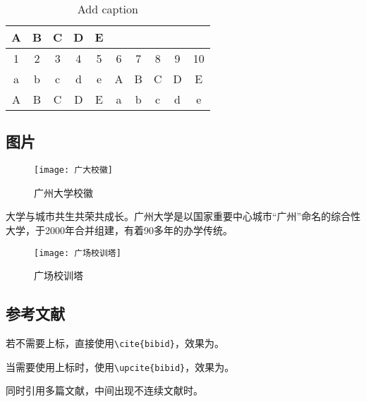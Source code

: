 \begin{table}[!htbp]
	\centering
	\caption{Add caption}	\label{tab:2}%
	\begin{tabular}{cccccccccc}
		\toprule
		A           & B           & C           & D           & E \\
		\midrule
		1           & 2           & 3           & 4           & 5  & 6           & 7           & 8           & 9           & 10\\
		a           & b           & c           & d           & e &A           & B           & C           & D           & E\\
		A           & B           & C           & D           & E &a           & b           & c           & d           & e \\
		\bottomrule
	\end{tabular}
\end{table}


\subsection{图片}

\begin{figure}[!htb]
	\centering
	\texttt{[image: 广大校徽]}
	\caption{广州大学校徽}
	\label{fig:01}
\end{figure}

大学与城市共生共荣共成长。广州大学是以国家重要中心城市“广州”命名的综合性大学，于2000年合并组建，有着90多年的办学传统。
\begin{figure}[!htb]
	\centering
	\texttt{[image: 广场校训塔]}
	\caption{广场校训塔}
	\label{fig:2}
\end{figure}







\subsection{参考文献}

若不需要上标，直接使用\verb*|\cite{bibid}|，效果为\cite{Armstrong2006,王先甲2018}。

当需要使用上标时，使用\verb*|\upcite{bibid}|，效果为。


同时引用多篇文献，中间出现不连续文献时。




